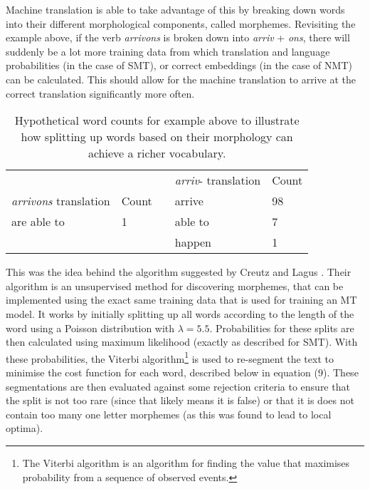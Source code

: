 \documentclass[11pt]{article}
\begin{document}
\bigskip

Machine translation is able to take advantage of this by breaking down words into their different morphological components, called morphemes. Revisiting the example above, if the verb \textit{arrivons} is broken down into \textit{arriv} + \textit{ons}, there will suddenly be a lot more training data from which translation and language probabilities (in the case of SMT), or correct embeddings (in the case of NMT) can be calculated. This should allow for the machine translation to arrive at the correct translation significantly more often.

\begin{table}[h]
\centering
\begin{tabular}{lll|l|l|}
\cline{4-5}
                                           &                            &  & \textit{arriv}- translation & Count \\ \cline{1-2} \cline{4-5} 
\multicolumn{1}{|l|}{\textit{arrivons} translation} & \multicolumn{1}{l|}{Count} &  & arrive             & 98    \\ \cline{1-2} \cline{4-5} 
\multicolumn{1}{|l|}{are able to}          & \multicolumn{1}{l|}{1}     &  & able to            & 7     \\ \cline{1-2} \cline{4-5} 
                                           &                            &  & happen             & 1     \\ \cline{4-5} 
\end{tabular}
\caption{Hypothetical word counts for example above to illustrate how splitting up words based on their morphology can achieve a richer vocabulary.}
\label{table:count-ex}
\end{table}

\bigskip

This was the idea behind the algorithm suggested by Creutz and Lagus \citeyearpar{creutz-lagus-2002-unsupervised}. Their algorithm is an unsupervised method for discovering morphemes, that can be implemented using the exact same training data that is used for training an MT model. It works by initially splitting up all words according to the length of the word using a Poisson distribution with $\lambda = 5.5$. Probabilities for these splits are then calculated using maximum likelihood (exactly as described for SMT). With these probabilities, the Viterbi algorithm\footnote{The Viterbi algorithm is an algorithm for finding the value that maximises probability from a sequence of observed events.} is used to re-segment the text to minimise the cost function for each word, described below in equation (9). These segmentations are then evaluated against some rejection criteria to ensure that the split is not too rare (since that likely means it is false) or that it is does not contain too many one letter morphemes (as this was found to lead to local optima).
\end{document}
